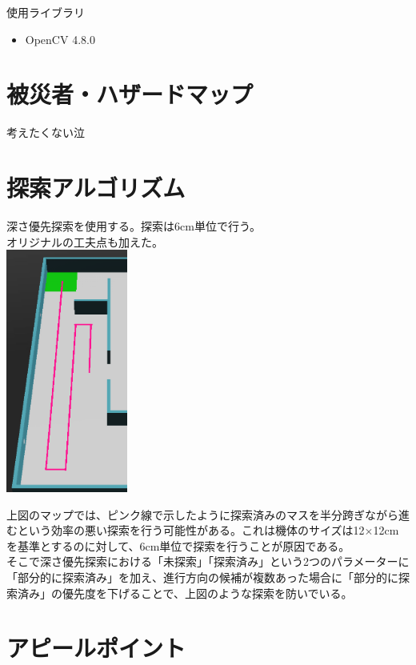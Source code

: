\documentclass[uplatex,dvipdfmx,a4paper]{jsarticle}
\begin{document}
  \noindent
  使用ライブラリ
  \begin{itemize}
    \item OpenCV 4.8.0
  \end{itemize}

  \section{被災者・ハザードマップ}
  考えたくない泣

  \section{探索アルゴリズム}
  深さ優先探索を使用する。探索は6cm単位で行う。\\
  オリジナルの工夫点も加えた。\\
  \includegraphics[width=40mm]{Photo/feagure1.png}

  上図のマップでは、ピンク線で示したように探索済みのマスを半分跨ぎながら進むという効率の悪い探索を行う可能性がある。これは機体のサイズは12$\times$12cmを基準とするのに対して、6cm単位で探索を行うことが原因である。\\
  そこで深さ優先探索における「未探索」「探索済み」という2つのパラメーターに「部分的に探索済み」を加え、進行方向の候補が複数あった場合に「部分的に探索済み」の優先度を下げることで、上図のような探索を防いでいる。\\

  \section{アピールポイント}
\end{document}
